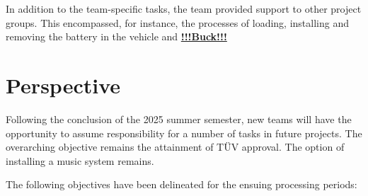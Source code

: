 
In addition to the team-specific tasks, the team provided support to other project groups. This encompassed, for instance, the processes of loading, installing and removing the battery in the vehicle and \textbf{\underline{!!!Buck!!!}}

\section*{Perspective}
%
%

%
Following the conclusion of the 2025 summer semester, new teams will have the opportunity to assume responsibility for a number of tasks in future projects.
The overarching objective remains the attainment of TÜV approval.
The option of installing a music system remains.

The following objectives have been delineated for the ensuing processing periods:

